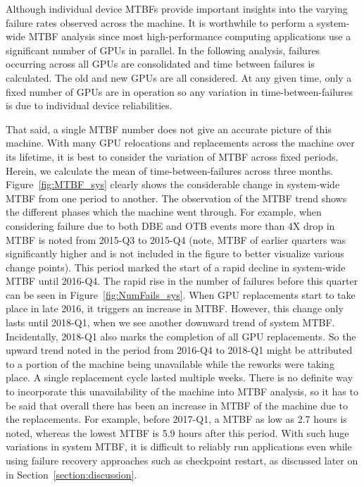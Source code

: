 Although individual device MTBFs provide important insights into the varying failure rates
observed across the machine. It is worthwhile to perform a system-wide MTBF analysis since 
most high-performance computing applications use a significant number of GPUs in parallel. 
In the following analysis, failures occurring across all GPUs are consolidated and time between failures
is calculated. The old and new GPUs are all considered. At any given time, only a fixed number of GPUs
are in operation so any variation in time-between-failures is due to individual device reliabilities.

That said, a single MTBF number does not give an accurate picture of this machine.
With many GPU relocations and replacements across the machine over its lifetime, it is 
best to consider the variation of MTBF across fixed periods. Herein, we calculate 
the mean of time-between-failures across three months. Figure~\ref{fig:MTBF_sys}
clearly shows the considerable change in system-wide MTBF from one period to another. 
The observation of the MTBF trend shows the different phases which the machine went through. 
For example, when considering failure due to both DBE and OTB events more than 4X drop in MTBF is 
noted from 2015-Q3 to 2015-Q4 (note, MTBF of earlier quarters was significantly higher and is not 
included in the figure to better visualize various change points). This period marked the start of 
a rapid decline in system-wide MTBF until 2016-Q4. The rapid rise in the number of failures before this 
quarter can be seen in Figure~\ref{fig:NumFails_sys}. When GPU replacements start to take place in late 
2016, it triggers an increase in MTBF. However, this change only lasts until 2018-Q1, when we see another 
downward trend of system MTBF. Incidentally, 2018-Q1 also marks the completion of all GPU replacements. 
So the upward trend noted in the period from 2016-Q4 to 2018-Q1 might be attributed to a portion of the machine 
being unavailable while the reworks were taking place. A single replacement cycle lasted multiple weeks. 
There is no definite way to incorporate this unavailability of the machine into MTBF analysis, so it has to
be said that overall there has been an increase in MTBF of the machine due to the replacements. 
For example, before 2017-Q1, a MTBF as low as 2.7 hours is noted, whereas the lowest MTBF is 5.9 hours after this 
period. With such huge variations in system MTBF, it is difficult to reliably run applications even while using 
failure recovery approaches such as checkpoint restart, as discussed later on in Section~\ref{section:discussion}. 

